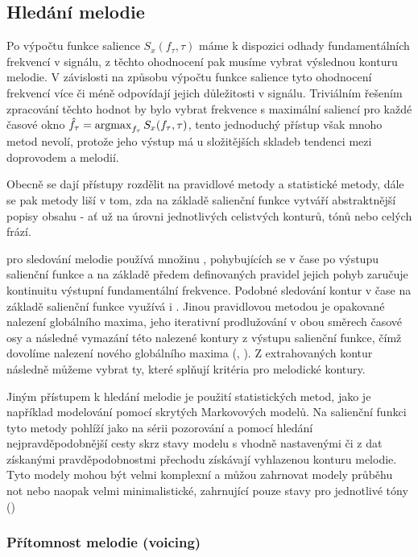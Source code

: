 \subsection{Hledání melodie}

Po výpočtu funkce salience $S_x(f_\tau, \tau)$ máme k dispozici odhady fundamentálních frekvencí v signálu, z těchto ohodnocení pak musíme vybrat výslednou konturu melodie. V závislosti na způsobu výpočtu funkce salience tyto ohodnocení frekvencí více či méně odpovídají jejich důležitosti v signálu. Triviálním řešením zpracování těchto hodnot by bylo vybrat frekvence s maximální saliencí pro každé časové okno $\hat{f}_\tau = \argmax_{f_\tau}{S_x(f_\tau, \tau)}$, tento jednoduchý přístup však mnoho metod nevolí, protože jeho výstup má u složitějších skladeb tendenci  mezi doprovodem a melodií.

Obecně se dají přístupy rozdělit na pravidlové metody a statistické metody, dále se pak metody liší v tom, zda na základě salienční funkce vytváří abstraktnější popisy obsahu - ať už na úrovni jednotlivých celistvých konturů, tónů nebo celých frází.

\cite{Goto1999} pro sledování melodie používá množinu , pohybujících se v čase po výstupu salienční funkce a na základě předem definovaných pravidel jejich pohyb zaručuje kontinuitu výstupní fundamentální frekvence. Podobné sledování kontur v čase na základě salienční funkce využívá i \cite{Dressler2009}. Jinou pravidlovou metodou je opakované nalezení globálního maxima, jeho iterativní prodlužování v obou směrech časové osy a následné vymazání této nalezené kontury z výstupu salienční funkce, čímž dovolíme nalezení nového globálního maxima (\cite{Cancela2008}, \cite{Salamon2012a}). Z extrahovaných kontur následně můžeme vybrat ty, které splňují kritéria pro melodické kontury.

Jiným přístupem k hledání melodie je použití statistických metod, jako je například modelování pomocí skrytých Markovových modelů. Na salienční funkci tyto metody pohlíží jako na sérii pozorování a pomocí hledání nejpravděpodobnější cesty skrz stavy modelu s vhodně nastavenými či z dat získanými pravděpodobnostmi přechodu získávají vyhlazenou konturu melodie. Tyto modely mohou být velmi komplexní a můžou zahrnovat modely průběhu not \citep{Ryynanen2008} nebo naopak velmi minimalistické, zahrnující pouze stavy pro jednotlivé tóny (\cite{Yeh2012})

\subsubsection{Přítomnost melodie (voicing)}

